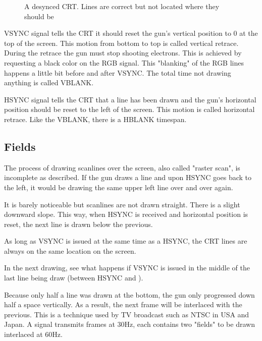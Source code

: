 \begin{figure}[H]
\caption*{A desynced CRT. Lines are correct but not located where they should be}
\end{figure}





VSYNC signal tells the CRT it should reset the gun's vertical position to 0 at the top of the screen. This motion from bottom to top is called vertical retrace. During the retrace the gun must stop shooting electrons. This is achieved by requesting a black color on the RGB signal. This "blanking" of the RGB lines happens a little bit before and after VSYNC. The total time not drawing anything is called VBLANK.

HSYNC signal tells the CRT that a line has been drawn and the gun's horizontal position should be reset to the left of the screen. This motion is called horizontal retrace. Like the VBLANK, there is a HBLANK timespan. 

\pagebreak
\subsection{Fields}

The process of drawing scanlines over the screen, also called "raster scan", is incomplete as described. If the gun draws a line and upon HSYNC goes back to the left, it would be drawing the same upper left line over and over again. 

It is barely noticeable but scanlines are not drawn straight. There is a slight downward slope. This way, when HSYNC is received and horizontal position is reset, the next line is drawn below the previous.




As long as VSYNC is issued at the same time as a HSYNC, the CRT lines are always on the same location on the screen.

In the next drawing, see what happens if VSYNC  is issued in the middle of the last line being draw (between HSYNC  and ).


Because only half a line was drawn at the bottom, the gun only progressed down half a space vertically. As a result, the next frame will be interlaced with the previous. This is a technique used by TV broadcast such as NTSC in USA and Japan. A signal transmits frames at 30Hz, each contains two "fields" to be drawn interlaced at 60Hz.

